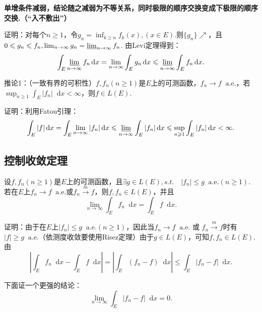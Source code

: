 \documentclass[bwprint, withoutpreface]{cumcmthesis}
\newcommand*{\dif}{\mathop{}\!\mathrm{d}}
\begin{document}
\textbf{单增条件减弱，结论随之减弱为不等关系，同时极限的顺序交换变成下极限的顺序交换.（“入不敷出”）}

证明：对每个$n \geqslant 1$，令$g_n = \inf_{k \geqslant n}{f_k(x)}, (x \in E)$.则$\{g_n\} \nearrow$，且$0 \leqslant g_n \leqslant f_n, \lim_{n \to \infty}{g_n} = \varliminf_{n \to \infty}{f_n}$. 由Levi定理得到：
\begin{equation*}
	\int_E \varliminf_{n \to \infty}{f_n} \dif x = \lim_{n \to \infty}{\int_E g_n \dif x \leqslant \varliminf_{n \to \infty}{\int_E f_n \dif x}}.
\end{equation*}

推论1：（一致有界的可积性）$f, f_n(n \geqslant 1)$是$E$上的可测函数，$f_n \to f \mathop{} \! \mathrm{a.e.}$，若$\sup_{n \geqslant 1}{\int_E |f_n| \dif x} < \infty$，则$f \in L(E)$.

证明：利用Fatou引理：
\begin{equation*}
	\int_E |f| \dif x = \int_E \lim_{n \to \infty}{|f_n|} \dif x \leqslant \varliminf_{n \to \infty}{\int_E |f_n| \dif x} \leqslant \sup_{n \geqslant 1}{\int_E |f_n| \dif x} < \infty.
\end{equation*}

\subsection{控制收敛定理}
设$f, f_n(n \geqslant 1)$是$E$上的可测函数，且$\exists g \in L(E), s.t. \quad |f_n| \leqslant g \mathop{} \! \mathrm{a.e.} (n \geqslant 1)$. 若在$E$上$f_n \to f \mathop{} \! \mathrm{a.e.}$或$f_n \stackrel{m}{\longrightarrow} f$，则$f, f_n \in L(E)$，并且
\begin{equation*}
	\lim_{n \to \infty} \int_E f_n \dif x = \int_E f \dif x.
\end{equation*}

证明：由于在$E$上$|f_n| \leqslant g \mathop{} \! \mathrm{a.e.} (n \geqslant 1)$，因此当$f_n \to f \mathop{} \! \mathrm{a.e.}$ 或 $f_n \stackrel{m}{\longrightarrow} f$时有$|f| \geqslant g \mathop{} \! \mathrm{a.e.}$（依测度收敛要使用Risez定理）由于$g \in L(E)$，可知$f, f_n \in L(E)$. 由
\begin{equation*}
	|\int_E f_n \dif x - \int_E f \dif x| = |\int_E (f_n - f) \dif x| \leqslant \int_E |f_n - f| \dif x.
\end{equation*}

下面证一个更强的结论：
\begin{equation*}
	\lim_{n \to \infty}{\int_E |f_n - f| \dif x} = 0.
\end{equation*}
\end{document}
